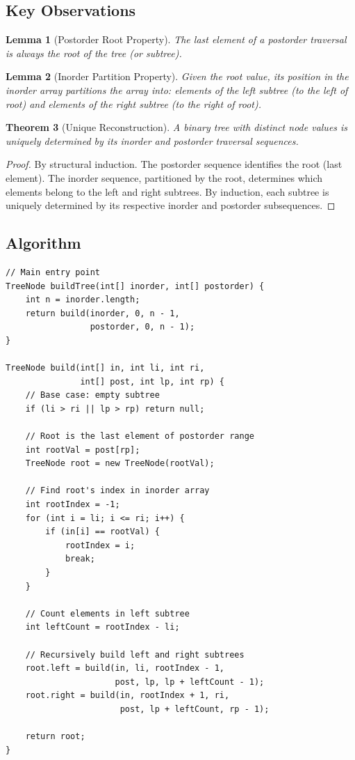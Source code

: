 \documentclass[10pt,journal,compsoc,onecolumn]{IEEEtran}
\newtheorem{theorem}{Theorem}
\newtheorem{lemma}[theorem]{Lemma}
\begin{document}
\subsection{Key Observations}

\begin{lemma}[Postorder Root Property]
The \emph{last} element of a postorder traversal is always the root of the tree (or subtree).
\end{lemma}

\begin{lemma}[Inorder Partition Property]
Given the root value, its position in the inorder array partitions the array into: elements of the left subtree (to the left of root) and elements of the right subtree (to the right of root).
\end{lemma}

\begin{theorem}[Unique Reconstruction]
A binary tree with distinct node values is uniquely determined by its inorder and postorder traversal sequences.
\end{theorem}

\begin{proof}
By structural induction. The postorder sequence identifies the root (last element). The inorder sequence, partitioned by the root, determines which elements belong to the left and right subtrees. By induction, each subtree is uniquely determined by its respective inorder and postorder subsequences.
\end{proof}

\subsection{Algorithm}

\begin{verbatim}
// Main entry point
TreeNode buildTree(int[] inorder, int[] postorder) {
    int n = inorder.length;
    return build(inorder, 0, n - 1,
                 postorder, 0, n - 1);
}

TreeNode build(int[] in, int li, int ri,
               int[] post, int lp, int rp) {
    // Base case: empty subtree
    if (li > ri || lp > rp) return null;
    
    // Root is the last element of postorder range
    int rootVal = post[rp];
    TreeNode root = new TreeNode(rootVal);
    
    // Find root's index in inorder array
    int rootIndex = -1;
    for (int i = li; i <= ri; i++) {
        if (in[i] == rootVal) {
            rootIndex = i;
            break;
        }
    }
    
    // Count elements in left subtree
    int leftCount = rootIndex - li;
    
    // Recursively build left and right subtrees
    root.left = build(in, li, rootIndex - 1,
                      post, lp, lp + leftCount - 1);
    root.right = build(in, rootIndex + 1, ri,
                       post, lp + leftCount, rp - 1);
    
    return root;
}
\end{verbatim}
\end{document}
